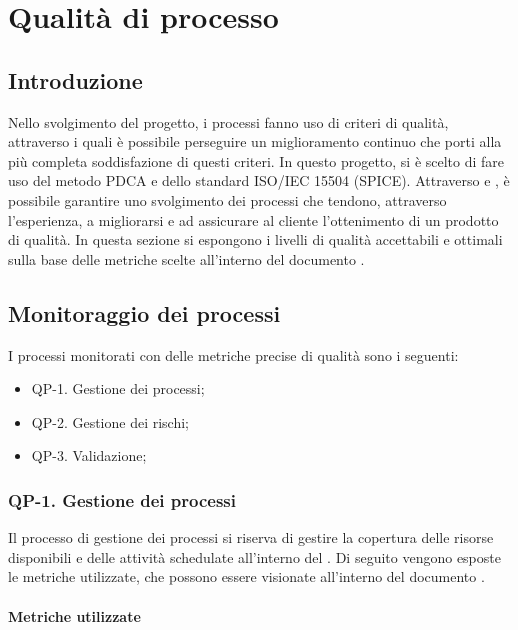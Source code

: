 \section{Qualità di processo}

\subsection{Introduzione}

Nello svolgimento del progetto, i processi fanno uso di criteri di qualità, attraverso i quali è possibile perseguire un miglioramento continuo che porti alla più completa soddisfazione di questi criteri. In questo progetto, si è scelto di fare uso del metodo PDCA e dello standard ISO/IEC 15504 (SPICE). Attraverso  e , è possibile garantire uno svolgimento dei processi che tendono, attraverso l'esperienza, a migliorarsi e ad assicurare al cliente l'ottenimento di un prodotto di qualità.
In questa sezione si espongono i livelli di qualità accettabili e ottimali sulla base delle metriche scelte all'interno del documento .

\subsection{Monitoraggio dei processi}

I processi monitorati con delle metriche precise di qualità sono i seguenti:

\begin{itemize}
	\item QP-1. Gestione dei processi;
	\item QP-2. Gestione dei rischi;
 	\item QP-3. Validazione;
\end{itemize}

	\subsubsection{QP-1. Gestione dei processi}

		Il processo di gestione dei processi si riserva di gestire la copertura delle risorse disponibili e delle attività schedulate all'interno del . Di seguito vengono esposte le metriche utilizzate, che possono essere visionate all'interno del documento .

		\paragraph{Metriche utilizzate}

